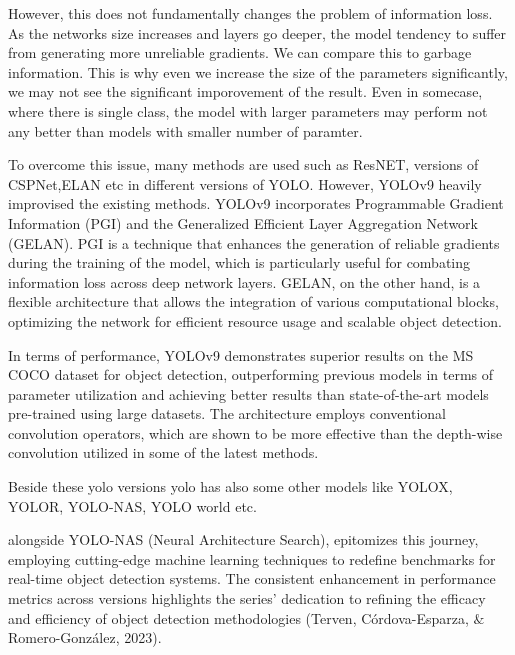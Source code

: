 However, this does not fundamentally changes the problem of information loss. As the networks size increases and layers go deeper, the model tendency to suffer from generating more unreliable gradients. We can compare this to garbage information. This is why even we increase the size of the parameters significantly, we may not see the significant imporovement of the result. Even in somecase, where there is single class, the model with larger parameters may perform not any better than models with smaller number of paramter.

To overcome this issue, many methods are used such as ResNET, versions of CSPNet,ELAN etc in different versions of YOLO. However, YOLOv9 \cite{wang2024yolov9} heavily improvised the existing methods. YOLOv9 incorporates Programmable Gradient Information (PGI) and the Generalized Efficient Layer Aggregation Network (GELAN). PGI is a technique that enhances the generation of reliable gradients during the training of the model, which is particularly useful for combating information loss across deep network layers. GELAN, on the other hand, is a flexible architecture that allows the integration of various computational blocks, optimizing the network for efficient resource usage and scalable object detection.


In terms of performance, YOLOv9 demonstrates superior results on the MS COCO dataset for object detection, outperforming previous models in terms of parameter utilization and achieving better results than state-of-the-art models pre-trained using large datasets. The architecture employs conventional convolution operators, which are shown to be more effective than the depth-wise convolution utilized in some of the latest methods.

Beside these yolo versions yolo has also some other models like YOLOX, YOLOR, YOLO-NAS, YOLO world etc. 







alongside YOLO-NAS (Neural Architecture Search), epitomizes this journey, employing cutting-edge machine learning techniques to redefine benchmarks for real-time object detection systems. The consistent enhancement in performance metrics across versions highlights the series' dedication to refining the efficacy and efficiency of object detection methodologies (Terven, Córdova-Esparza, $\&$ Romero-González, 2023).




